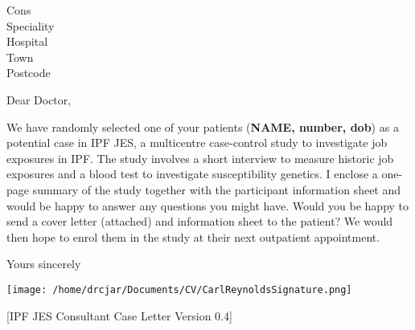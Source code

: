 \documentclass[imperial,letterpaper,pagesize,UScommercial9]{scrlttr2}
\begin{document}
\begin{letter}{Cons \\ Speciality \\ Hospital \\ Town \\ Postcode}


\opening{Dear Doctor,}

    We have randomly selected one of your patients (\textbf{NAME, number, dob}) as a potential case in IPF JES, a multicentre case-control study to investigate job exposures in IPF.
    The study involves a short interview to measure historic job exposures and a blood test to investigate susceptibility genetics. I enclose a one-page summary of the study together with the participant information sheet and would be happy to answer any questions you might have.
    Would you be happy to send a cover letter (attached) and information sheet to the patient? We would then hope to enrol them in the study at their next outpatient appointment.



\closing{Yours sincerely}

    \texttt{[image: /home/drcjar/Documents/CV/CarlReynoldsSignature.png]}

     \vfill \hfill [IPF JES Consultant Case Letter Version 0.4]

\end{letter}
\end{document}
